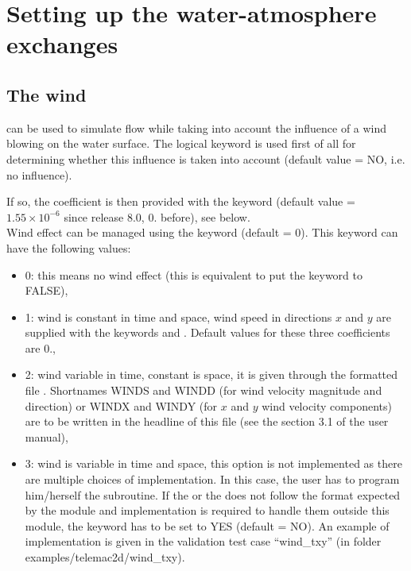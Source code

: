 \section{Setting up the water-atmosphere exchanges}

\subsection{The wind}

 can be used to simulate flow while taking into account the influence
of a wind blowing on the water surface. The logical keyword  is
used first of all for determining whether this influence is taken into account
(default value = NO, i.e. no influence).

If so, the coefficient is then provided with the keyword
 (default value =
$1.55 \times 10^{-6}$ since release 8.0, 0. before), see below.\\

Wind effect can be managed using the keyword 
(default = 0). This keyword can have the following values:

\begin{itemize}
\item 0: this means no wind effect (this is equivalent to put the keyword
 to FALSE),

\item 1: wind is constant in time and space, wind speed in directions $x$ and $y$
are supplied with the keywords  and
.
Default values for these three coefficients are 0.,

\item 2: wind variable in time, constant is space, it is given through
the formatted file .
Shortnames WINDS and WINDD (for wind velocity magnitude and direction) or
WINDX and WINDY (for $x$ and $y$ wind velocity components) are to be written
in the headline of this file (see the section 3.1 of the \waqtel user manual),

\item 3: wind is variable in time and space,
this option is not implemented as there are multiple choices of implementation.
In this case, the user has to program him/herself the  subroutine.
If the  or the
 does not follow the format expected by the
 module and implementation is required to handle them
outside this module, the keyword 
has to be set to YES (default = NO).
An example of implementation is given in the  validation test case
``wind\_txy'' (in folder examples/telemac2d/wind\_txy).
\end{itemize}

